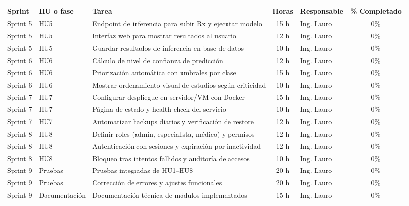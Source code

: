 \documentclass[
11pt, %
]{charter}
\begin{document}
\begin{table}[htpb]
\centering
\begin{tabularx}{\linewidth}{@{}|l|l|X|c|l|c|@{}}
\hline
\rowcolor[HTML]{C0C0C0}
Sprint & HU o fase & Tarea & Horas & Responsable & \% Completado \\ \hline
Sprint 5 & HU5 & Endpoint de inferencia para subir Rx y ejecutar modelo & 15 h & Ing. Lauro & 0\% \\ \hline
Sprint 5 & HU5 & Interfaz web para mostrar resultados al usuario & 12 h & Ing. Lauro & 0\% \\ \hline
Sprint 5 & HU5 & Guardar resultados de inferencia en base de datos & 10 h & Ing. Lauro & 0\% \\ \hline
Sprint 6 & HU6 & Cálculo de nivel de confianza de predicción & 12 h & Ing. Lauro & 0\% \\ \hline
Sprint 6 & HU6 & Priorización automática con umbrales por clase & 15 h & Ing. Lauro & 0\% \\ \hline
Sprint 6 & HU6 & Mostrar ordenamiento visual de estudios según criticidad & 10 h & Ing. Lauro & 0\% \\ \hline
Sprint 7 & HU7 & Configurar despliegue en servidor/VM con Docker & 15 h & Ing. Lauro & 0\% \\ \hline
Sprint 7 & HU7 & Página de estado y health-check del servicio & 10 h & Ing. Lauro & 0\% \\ \hline
Sprint 7 & HU7 & Automatizar backups diarios y verificación de restore & 12 h & Ing. Lauro & 0\% \\ \hline
Sprint 8 & HU8 & Definir roles (admin, especialista, médico) y permisos & 12 h & Ing. Lauro & 0\% \\ \hline
Sprint 8 & HU8 & Autenticación con sesiones y expiración por inactividad & 12 h & Ing. Lauro & 0\% \\ \hline
Sprint 8 & HU8 & Bloqueo tras intentos fallidos y auditoría de accesos & 10 h & Ing. Lauro & 0\% \\ \hline
Sprint 9 & Pruebas & Pruebas integradas de HU1–HU8 & 20 h & Ing. Lauro & 0\% \\ \hline
Sprint 9 & Pruebas & Corrección de errores y ajustes funcionales & 20 h & Ing. Lauro & 0\% \\ \hline
Sprint 9 & Documentación & Documentación técnica de módulos implementados & 15 h & Ing. Lauro & 0\% \\ \hline
\end{tabularx}
\end{table}
\end{document}

